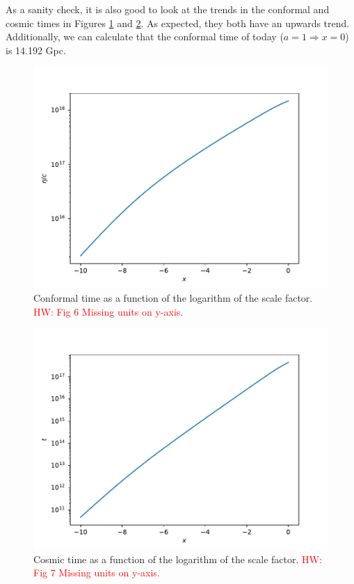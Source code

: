 \documentclass{aa}
\newcommand{\hw}[1]{\textcolor{red}{HW: #1}}
\begin{document}
As a sanity check, it is also good to look at the trends in the conformal and cosmic times in Figures \ref{fig:eta} and \ref{fig:t}. As expected, they both have an upwards trend. Additionally, we can calculate that the conformal time of today ($a = 1 \Rightarrow x = 0$) is 14.192 Gpc.

\begin{figure}[ht]
\centering
\includegraphics[width=\hsize]{figures/eta_over_c.pdf}
  \caption{Conformal time as a function of the logarithm of the scale factor. \hw{Fig 6 Missing units on y-axis.}}
     \label{fig:eta}
\end{figure}

\begin{figure}[ht]
\centering
\includegraphics[width=\hsize]{figures/t.pdf}
  \caption{Cosmic time as a function of the logarithm of the scale factor. \hw{Fig 7 Missing units on y-axis.}}
     \label{fig:t}
\end{figure}
\end{document}
